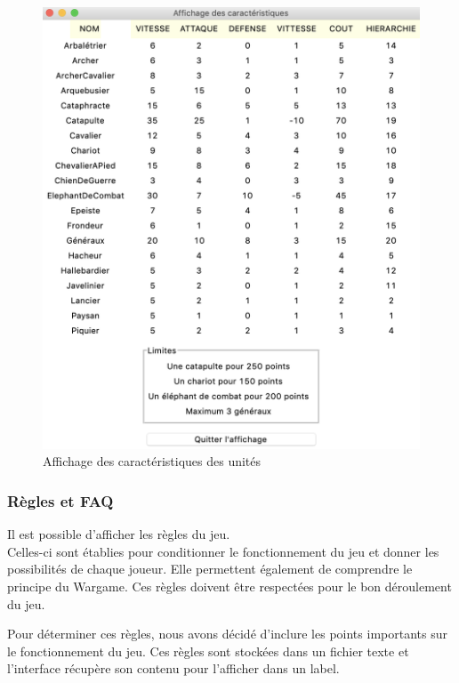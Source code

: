 \documentclass[a4paper]{article} %
\begin{document}
\begin{figure}[!h]
	\begin{center}
	\includegraphics[scale= 0.4]{Images/afficherCaracteristiques.png}
	\caption{Affichage des caractéristiques des unités\label{fig:AfficherCaractéristiques}}
	\end{center}
\end{figure}

		\subsubsection{Règles et FAQ}\label{ReglesFaq}
Il est possible d'afficher les règles du jeu. 
\\
Celles-ci sont établies pour conditionner le fonctionnement du jeu et donner les possibilités de chaque joueur. Elle permettent également de comprendre le principe du Wargame. Ces règles doivent être respectées pour le bon déroulement du jeu.

Pour déterminer ces règles, nous avons décidé d'inclure les points importants sur le fonctionnement du jeu. Ces règles sont stockées dans un fichier texte et l'interface récupère son contenu pour l'afficher dans un label.
\end{document}
